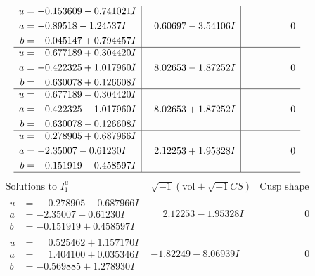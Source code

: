 \documentclass[1p]{elsarticle_modified}
\theoremstyle{definition}
\newcommand{\I}{\sqrt{-1}}
\begin{document}
$$\begin{array}{c|c|c}
\begin{aligned}
u &= -0.153609 - 0.741021 I \\
a &= -0.89518 - 1.24537 I \\
b &= -0.045147 + 0.794457 I\end{aligned}
 & \phantom{-}0.60697 - 3.54106 I & \phantom{-0.000000 } 0 \\ \hline\begin{aligned}
u &= \phantom{-}0.677189 + 0.304420 I \\
a &= -0.422325 + 1.017960 I \\
b &= \phantom{-}0.630078 + 0.126608 I\end{aligned}
 & \phantom{-}8.02653 - 1.87252 I & \phantom{-0.000000 } 0 \\ \hline\begin{aligned}
u &= \phantom{-}0.677189 - 0.304420 I \\
a &= -0.422325 - 1.017960 I \\
b &= \phantom{-}0.630078 - 0.126608 I\end{aligned}
 & \phantom{-}8.02653 + 1.87252 I & \phantom{-0.000000 } 0 \\ \hline\begin{aligned}
u &= \phantom{-}0.278905 + 0.687966 I \\
a &= -2.35007 - 0.61230 I \\
b &= -0.151919 - 0.458597 I\end{aligned}
 & \phantom{-}2.12253 + 1.95328 I & \phantom{-0.000000 } 0\\
 \hline 
 \end{array}$$\newpage$$\begin{array}{c|c|c}  
\text{Solutions to }I^u_{1}& \I (\text{vol} + \sqrt{-1}CS) & \text{Cusp shape}\\
 \hline 
\begin{aligned}
u &= \phantom{-}0.278905 - 0.687966 I \\
a &= -2.35007 + 0.61230 I \\
b &= -0.151919 + 0.458597 I\end{aligned}
 & \phantom{-}2.12253 - 1.95328 I & \phantom{-0.000000 } 0 \\ \hline\begin{aligned}
u &= \phantom{-}0.525462 + 1.157170 I \\
a &= \phantom{-}1.404100 + 0.035346 I \\
b &= -0.569885 + 1.278930 I\end{aligned}
 & -1.82249 - 8.06939 I & \phantom{-0.000000 } 0 \\ \hline\begin{aligned}

\end{aligned}
\end{array}$$
\end{document}
